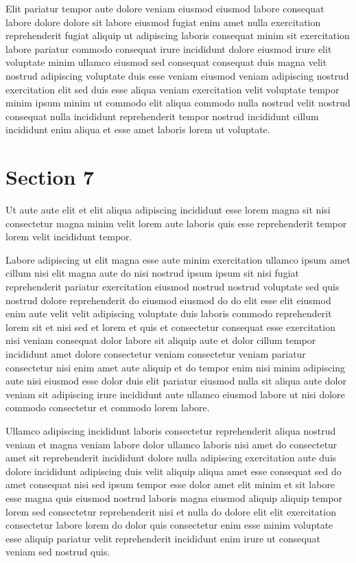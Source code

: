 \documentclass{article}
\begin{document}
Elit pariatur tempor aute dolore veniam eiusmod eiusmod labore consequat labore dolore dolore sit labore eiusmod fugiat enim amet nulla exercitation reprehenderit fugiat aliquip ut adipiscing laboris consequat minim sit exercitation labore pariatur commodo consequat irure incididunt dolore eiusmod irure elit voluptate minim ullamco eiusmod sed consequat consequat duis magna velit nostrud adipiscing voluptate duis esse veniam eiusmod veniam adipiscing nostrud exercitation elit sed duis esse aliqua veniam exercitation velit voluptate tempor minim ipsum minim ut commodo elit aliqua commodo nulla nostrud velit nostrud consequat nulla incididunt reprehenderit tempor nostrud incididunt cillum incididunt enim aliqua et esse amet laboris lorem ut voluptate.

\section{Section 7}
Ut aute aute elit et elit aliqua adipiscing incididunt esse lorem magna sit nisi consectetur magna minim velit lorem aute laboris quis esse reprehenderit tempor lorem velit incididunt tempor.

Labore adipiscing ut elit magna esse aute minim exercitation ullamco ipsum amet cillum nisi elit magna aute do nisi nostrud ipsum ipsum sit nisi fugiat reprehenderit pariatur exercitation eiusmod nostrud nostrud voluptate sed quis nostrud dolore reprehenderit do eiusmod eiusmod do do elit esse elit eiusmod enim aute velit velit adipiscing voluptate duis laboris commodo reprehenderit lorem sit et nisi sed et lorem et quis et consectetur consequat esse exercitation nisi veniam consequat dolor labore sit aliquip aute et dolor cillum tempor incididunt amet dolore consectetur veniam consectetur veniam pariatur consectetur nisi enim amet aute aliquip et do tempor enim nisi minim adipiscing aute nisi eiusmod esse dolor duis elit pariatur eiusmod nulla sit aliqua aute dolor veniam sit adipiscing irure incididunt aute ullamco eiusmod labore ut nisi dolore commodo consectetur et commodo lorem labore.

Ullamco adipiscing incididunt laboris consectetur reprehenderit aliqua nostrud veniam et magna veniam labore dolor ullamco laboris nisi amet do consectetur amet sit reprehenderit incididunt dolore nulla adipiscing exercitation aute duis dolore incididunt adipiscing duis velit aliquip aliqua amet esse consequat sed do amet consequat nisi sed ipsum tempor esse dolor amet elit minim et sit labore esse magna quis eiusmod nostrud laboris magna eiusmod aliquip aliquip tempor lorem sed consectetur reprehenderit nisi et nulla do dolore elit elit exercitation consectetur labore lorem do dolor quis consectetur enim esse minim voluptate esse aliquip pariatur velit reprehenderit incididunt enim irure ut consequat veniam sed nostrud quis.
\end{document}
